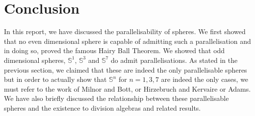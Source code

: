\documentclass[12pt,a4paper]{article}
\numberwithin{equation}{section}
\theoremstyle{definition}
\theoremstyle{remark}
\begin{document}
\section{Conclusion}
In this report, we have discussed the parallelisability of spheres. We first showed that no even dimensional sphere is capable of admitting such a parallelisation and in doing so, proved the famous Hairy Ball Theorem. We showed that odd dimensional spheres, $\mathbb{S}^1$, $\mathbb{S}^3$ and $\mathbb{S}^7$ do admit parallelisations. As stated in the previous section, we claimed that these are indeed the only parallelisable spheres but in order to actually show that $\mathbb{S}^n$ for $n=1,3,7$ are indeed the only cases, we must refer to the work of Milnor and Bott, or Hirzebruch and Kervaire or Adams. We have also briefly discussed the relationship between these parallelisable spheres and the existence to division algebras and related results.

\clearpage



\end{document}

